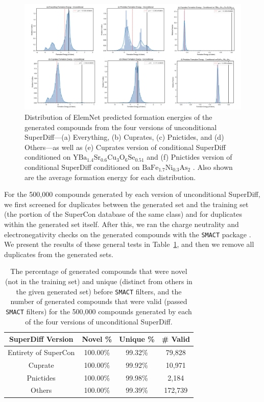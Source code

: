 \documentclass[%
reprint,
 amsmath,amssymb,
 aps,
prb,
]{revtex4-2}
\begin{document}
\begin{figure}
    \centering
    \includegraphics[width=15cm]{formation_energy_dist_wconditional.jpg}
    \caption{Distribution of ElemNet \cite{Jha2018, Jha2019} predicted formation energies of the generated compounds from the four versions of unconditional SuperDiff---(a) Everything, (b) Cuprates, (c) Pnictides, and (d) Others---as well as (e) Cuprates version of conditional SuperDiff conditioned on $\mathrm{YBa_{1.4}Sr_{0.6}Cu_{3}O_{6}Se_{0.51}}$ \cite{grinenko2023extraordinary} and (f) Pnictides version of conditional SuperDiff conditioned on $\mathrm{BaFe_{1.7}Ni_{0.3}As_{2}}$ \cite{Wang2013}. Also shown are the average formation energy for each distribution.}
    \label{fig:form_energy}
\end{figure}


For the 500,000 compounds generated by each version of unconditional SuperDiff, we first screened for duplicates between the generated set and the training set (the portion of the SuperCon database of the same class) and for duplicates within the generated set itself. After this, we ran the charge neutrality and electronegativity checks on the generated compounds with the \texttt{SMACT} package \cite{DAVIES2016617}. We present the results of these general tests in Table~\ref{tab:dnv}, and then we remove all duplicates from the generated sets.

\begin{table}
    \centering
    \begin{ruledtabular}
    \begin{tabular}{cccc}
        SuperDiff Version & Novel \% & Unique \% & \# Valid \\
        \hline
        Entirety of SuperCon & 100.00\% & 99.32\% & 79,828 \\
        Cuprate  & 100.00\% &  99.92\% & 10,971 \\
        Pnictides  & 100.00\% & 99.98\% & 2,184 \\
        Others &  100.00\% & 99.39\% & 172,739
    \end{tabular}
    \end{ruledtabular}
    
    \caption{The percentage of generated compounds that were novel (not in the training set) and unique (distinct from others in the given generated set) before \texttt{SMACT} \cite{DAVIES2016617} filters, and the number of generated compounds that were valid (passed \texttt{SMACT} filters) for the 500,000 compounds generated by each of the four versions of unconditional SuperDiff.}
    \label{tab:dnv}
\end{table}
\end{document}
